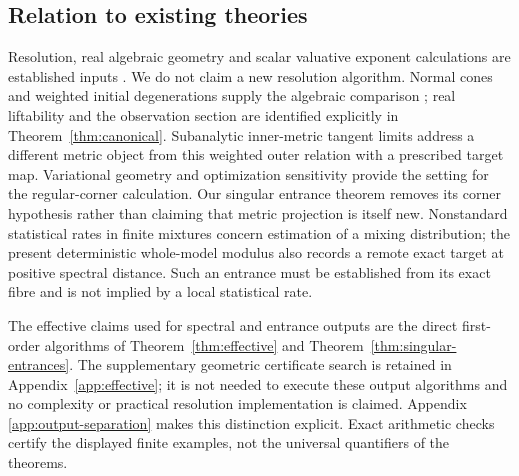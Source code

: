 \subsection*{Relation to existing theories}
Resolution, real algebraic geometry and scalar valuative exponent
calculations are established inputs
\cite{BM88,BM97,BM08,BE09,BPR06,BCR98,ENV03,Ha26,Hardt80}.
We do not claim a new resolution algorithm. Normal cones and weighted
initial degenerations supply the algebraic comparison
\cite{Fulton98,StacksCone,MS15}; real liftability and the observation
section are identified explicitly in Theorem~\ref{thm:canonical}.
Subanalytic inner-metric tangent limits \cite{BL07} address a different
metric object from this weighted outer relation with a prescribed target
map. Variational geometry and optimization sensitivity
\cite{RW98,BS98,BS00} provide the setting for the regular-corner
calculation. Our singular entrance theorem removes its corner hypothesis
rather than claiming that metric projection is itself new.
Nonstandard statistical rates in finite mixtures \cite{Chen95} concern
estimation of a mixing distribution; the present deterministic
whole-model modulus also records a remote exact target at positive
spectral distance. Such an entrance must be established from its exact
fibre and is not implied by a local statistical rate.

The effective claims used for spectral and entrance outputs are the
direct first-order algorithms of Theorem~\ref{thm:effective} and
Theorem~\ref{thm:singular-entrances}. The supplementary geometric
certificate search is retained in Appendix~\ref{app:effective}; it is
not needed to execute these output algorithms and no complexity or
practical resolution implementation is claimed. Appendix
\ref{app:output-separation} makes this distinction explicit. Exact
arithmetic checks certify the displayed finite examples, not the
universal quantifiers of the theorems.













\appendix




